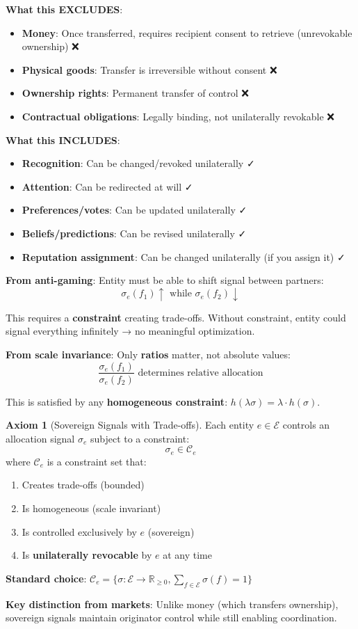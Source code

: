 \documentclass[11pt,a4paper]{article}
\theoremstyle{definition}
\newtheorem{axiom}[theorem]{Axiom}
\theoremstyle{remark}
\newcommand{\E}{\mathcal{E}}
\begin{document}
\textbf{What this EXCLUDES}:
\begin{itemize}
\item \textbf{Money}: Once transferred, requires recipient consent to retrieve (unrevokable ownership) ❌
\item \textbf{Physical goods}: Transfer is irreversible without consent ❌
\item \textbf{Ownership rights}: Permanent transfer of control ❌
\item \textbf{Contractual obligations}: Legally binding, not unilaterally revokable ❌
\end{itemize}

\textbf{What this INCLUDES}:
\begin{itemize}
\item \textbf{Recognition}: Can be changed/revoked unilaterally ✓
\item \textbf{Attention}: Can be redirected at will ✓
\item \textbf{Preferences/votes}: Can be updated unilaterally ✓
\item \textbf{Beliefs/predictions}: Can be revised unilaterally ✓
\item \textbf{Reputation assignment}: Can be changed unilaterally (if you assign it) ✓
\end{itemize}

\textbf{From anti-gaming}: Entity must be able to shift signal between partners:
\[ \sigma_e(f_1) \uparrow \text{ while } \sigma_e(f_2) \downarrow \]

This requires a \textbf{constraint} creating trade-offs. Without constraint, entity could signal everything infinitely → no meaningful optimization.

\textbf{From scale invariance}: Only \textbf{ratios} matter, not absolute values:
\[ \frac{\sigma_e(f_1)}{\sigma_e(f_2)} \text{ determines relative allocation} \]

This is satisfied by any \textbf{homogeneous constraint}: $h(\lambda \sigma) = \lambda \cdot h(\sigma)$.

\begin{axiom}[Sovereign Signals with Trade-offs]
Each entity $e \in \E$ controls an allocation signal $\sigma_e$ subject to a constraint:
\[ \sigma_e \in \mathcal{C}_e \]
where $\mathcal{C}_e$ is a constraint set that:
\begin{enumerate}
\item Creates trade-offs (bounded)
\item Is homogeneous (scale invariant)
\item Is controlled exclusively by $e$ (sovereign)
\item Is \textbf{unilaterally revocable} by $e$ at any time
\end{enumerate}

\textbf{Standard choice}: $\mathcal{C}_e = \{\sigma : \E \to \mathbb{R}_{\ge 0}, \sum_{f \in \E} \sigma(f) = 1\}$

\textbf{Key distinction from markets}: Unlike money (which transfers ownership), sovereign signals maintain originator control while still enabling coordination.
\end{axiom}
\end{document}
